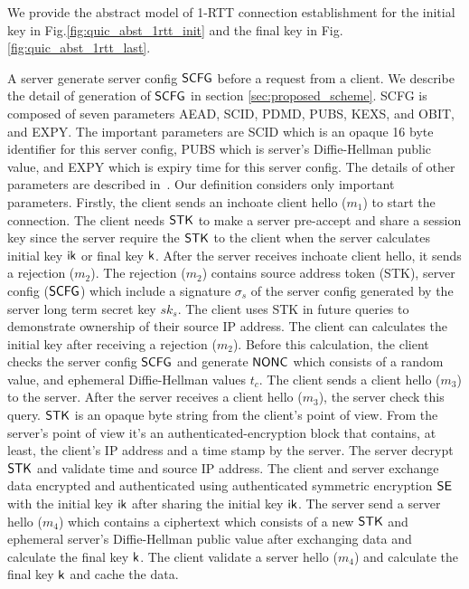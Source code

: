 We provide the abstract model of 1-RTT connection establishment
for the initial key in Fig.\ref{fig:quic_abst_1rtt_init} and
the final key in Fig.\ref{fig:quic_abst_1rtt_last}.
%

\ONERTTtrue
\ORIGINALtrue

%
A server generate server config $\mathsf{SCFG}$ before a request from a client.
We describe the detail of generation of $\mathsf{SCFG}$ in section \ref{sec:proposed_scheme}.
SCFG is composed of seven parameters AEAD, SCID, PDMD,
PUBS, KEXS, and OBIT, and EXPY. The important parameters
are SCID which is an opaque 16 byte identifier for
this server config, PUBS which is server's
Diffie-Hellman public value, and EXPY which is expiry time
for this server config. The details of other parameters
are described in~\cite{QUIC:Crypto}.
Our definition considers only important parameters.
Firstly, the client sends an inchoate client
hello ($m_1$) to start the connection.
The client needs $\mathsf{STK}$ to make a server pre-accept and share
a session key since the server require the $\mathsf{STK}$ to the client
when the server calculates initial key $\mathsf{ik}$ or final key $\mathsf{k}$.
After the server receives inchoate client hello, it
sends a rejection ($m_2$). The rejection ($m_2$) contains
source address token (STK), server config ($\mathsf{SCFG}$) which
include a signature $\sigma_s$ of the server config generated
by the server long term secret key $sk_s$. The client uses
STK in future queries to demonstrate ownership of their
source IP address.
The client can calculates the initial key after receiving
a rejection ($m_2$). Before this calculation, the client
checks the server config $\mathsf{SCFG}$ and generate $\mathsf{NONC}$ which consists
of a random value, and ephemeral
Diffie-Hellman values $t_c$.
The client sends a client hello ($m_3$) to the server.
After the server receives a client hello ($m_3$), the
server check this query. $\mathsf{STK}$ is an opaque byte string
from the client's point of view. From the server's point
of view it's an authenticated-encryption block that
contains, at least, the client's IP address and a time
stamp by the server. The server decrypt $\mathsf{STK}$ and
validate time and source IP address.
The client and server
exchange data encrypted and authenticated using authenticated
symmetric encryption $\mathsf{SE}$ with the initial key $\mathsf{ik}$ after
sharing the initial key $\mathsf{ik}$.
The server send a server hello ($m_4$) which contains
a ciphertext which consists of a new $\mathsf{STK}$ and ephemeral server's
Diffie-Hellman public value after exchanging data and
calculate the final key $\mathsf{k}$.
The client validate a server hello ($m_4$) and calculate
the final key $\mathsf{k}$ and cache the data.

